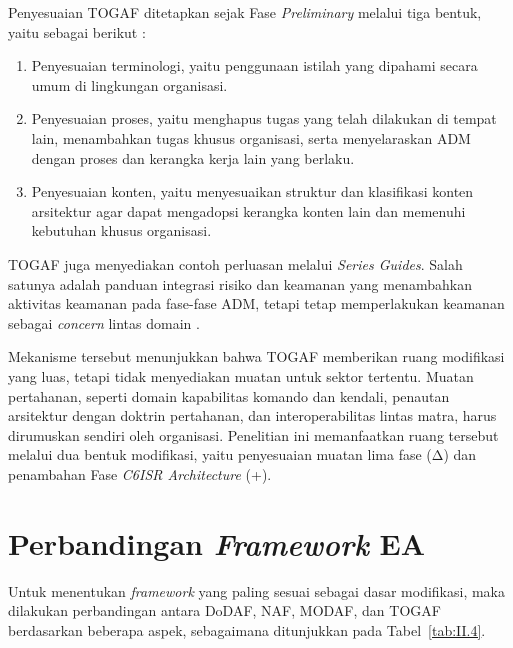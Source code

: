 Penyesuaian TOGAF ditetapkan sejak Fase \textit{Preliminary} melalui tiga bentuk, yaitu sebagai berikut \cite{TOGAF2022}:
\begin{enumerate}[label=\arabic*.]
\item Penyesuaian terminologi, yaitu penggunaan istilah yang dipahami secara umum di lingkungan organisasi.
\item Penyesuaian proses, yaitu menghapus tugas yang telah dilakukan di tempat lain, menambahkan tugas khusus organisasi, serta menyelaraskan ADM dengan proses dan kerangka kerja lain yang berlaku.
\item Penyesuaian konten, yaitu menyesuaikan struktur dan klasifikasi konten arsitektur agar dapat mengadopsi kerangka konten lain dan memenuhi kebutuhan khusus organisasi.
\end{enumerate}

TOGAF juga menyediakan contoh perluasan melalui \textit{Series Guides}. Salah satunya adalah panduan integrasi risiko dan keamanan yang menambahkan aktivitas keamanan pada fase-fase ADM, tetapi tetap memperlakukan keamanan sebagai \textit{concern} lintas domain \cite{TOGAFRiskSecurity}.

Mekanisme tersebut menunjukkan bahwa TOGAF memberikan ruang modifikasi yang luas, tetapi tidak menyediakan muatan untuk sektor tertentu. Muatan pertahanan, seperti domain kapabilitas komando dan kendali, penautan arsitektur dengan doktrin pertahanan, dan interoperabilitas lintas matra, harus dirumuskan sendiri oleh organisasi. Penelitian ini memanfaatkan ruang tersebut melalui dua bentuk modifikasi, yaitu penyesuaian muatan lima fase (Δ) dan penambahan Fase \textit{C6ISR Architecture} (+).

\section{Perbandingan \textit{Framework} EA}
\label{sec:II.6}

Untuk menentukan \textit{framework} yang paling sesuai sebagai dasar modifikasi, maka dilakukan perbandingan antara DoDAF, NAF, MODAF, dan TOGAF berdasarkan beberapa aspek, sebagaimana ditunjukkan pada Tabel~\ref{tab:II.4}.

